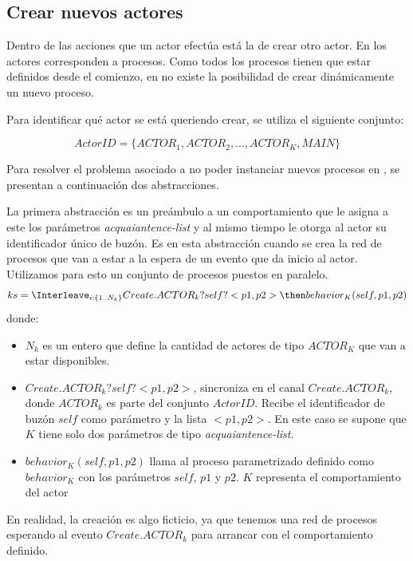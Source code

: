 \subsection{Crear nuevos actores}\label{modelo:crear}

Dentro de las acciones que un actor efectúa está la de crear otro actor. En \CSP los actores corresponden a procesos. Como todos los procesos tienen que estar definidos desde el comienzo, en \CSP no existe la posibilidad de crear dinámicamente un nuevo proceso.

Para identificar qué actor se está queriendo crear, se utiliza el siguiente conjunto: 

\begin{equation}\label{eq:actorid}
  ActorID = \Big\{ ACTOR_1, ACTOR_2, \ldots, ACTOR_K, MAIN \Big\}
\end{equation}

Para resolver el problema asociado a no poder instanciar nuevos procesos en \CSP, se presentan a continuación dos abstracciones.

La primera abstracción es un preámbulo a un comportamiento que le asigna a este los parámetros \textit{acquaiantence-list} y al mismo tiempo le otorga al actor su identificador único de buzón. Es en esta abstracción cuando se crea la red de procesos que van a estar a la espera de un evento que da inicio al actor. Utilizamos para esto un conjunto de procesos puestos en paralelo.
\begin{equation}\label{eq:createactor}
ks = \Interleave_{i: \{1 .. N_k\}} Create.ACTOR_k?self?<p1, p2> \then behavior_K(self, p1, p2) 
\end{equation}
donde:
\begin{itemize}
 \item $N_k$ es un entero que define la cantidad de actores de tipo $ACTOR_K$ que van a estar disponibles.
 \item $Create.ACTOR_k?self?<p1, p2>$, sincroniza en el canal $Create.ACTOR_k$, donde $ACTOR_k$ es parte del conjunto $ActorID$. Recibe el identificador de buzón $self$ como parámetro y la lista $<p1, p2>$. En este caso se supone que $K$ tiene solo dos parámetros de tipo \textit{acquaiantence-list}. 
 \item $behavior_K(self, p1, p2)$ llama al proceso parametrizado definido como $behavior_K$ con los parámetros $self$, $p1$ y $p2$. $K$ representa el comportamiento del actor
\end{itemize}

En realidad, la creación es algo ficticio, ya que tenemos una red de procesos \CSP esperando al evento $Create.ACTOR_k$ para arrancar con el comportamiento definido. 


